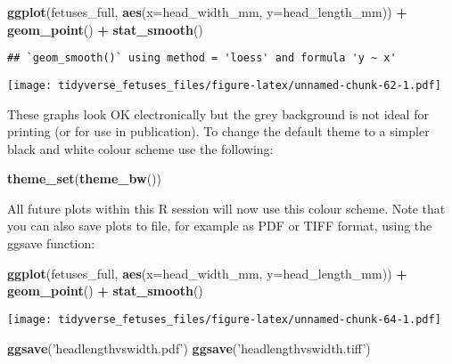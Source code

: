 \documentclass[
]{article}
\newenvironment{Shaded}{\begin{snugshade}}{\end{snugshade}}
\newcommand{\DataTypeTok}[1]{\textcolor[rgb]{0.13,0.29,0.53}{#1}}
\newcommand{\KeywordTok}[1]{\textcolor[rgb]{0.13,0.29,0.53}{\textbf{#1}}}
\newcommand{\NormalTok}[1]{#1}
\newcommand{\OperatorTok}[1]{\textcolor[rgb]{0.81,0.36,0.00}{\textbf{#1}}}
\newcommand{\StringTok}[1]{\textcolor[rgb]{0.31,0.60,0.02}{#1}}
\begin{document}
\begin{Shaded}
\begin{Highlighting}[]
\KeywordTok{ggplot}\NormalTok{(fetuses_full, }\KeywordTok{aes}\NormalTok{(}\DataTypeTok{x=}\NormalTok{head_width_mm, }\DataTypeTok{y=}\NormalTok{head_length_mm)) }\OperatorTok{+}
\StringTok{    }\KeywordTok{geom_point}\NormalTok{() }\OperatorTok{+}
\StringTok{    }\KeywordTok{stat_smooth}\NormalTok{()}
\end{Highlighting}
\end{Shaded}

\begin{verbatim}
## `geom_smooth()` using method = 'loess' and formula 'y ~ x'
\end{verbatim}

\texttt{[image: tidyverse\_fetuses\_files/figure-latex/unnamed-chunk-62-1.pdf]}

These graphs look OK electronically but the grey background is not ideal
for printing (or for use in publication). To change the default theme to
a simpler black and white colour scheme use the following:

\begin{Shaded}
\begin{Highlighting}[]
\KeywordTok{theme_set}\NormalTok{(}\KeywordTok{theme_bw}\NormalTok{())}
\end{Highlighting}
\end{Shaded}

All future plots within this R session will now use this colour scheme.
Note that you can also save plots to file, for example as PDF or TIFF
format, using the ggsave function:

\begin{Shaded}
\begin{Highlighting}[]
\KeywordTok{ggplot}\NormalTok{(fetuses_full, }\KeywordTok{aes}\NormalTok{(}\DataTypeTok{x=}\NormalTok{head_width_mm, }\DataTypeTok{y=}\NormalTok{head_length_mm)) }\OperatorTok{+}
\StringTok{    }\KeywordTok{geom_point}\NormalTok{() }\OperatorTok{+}
\StringTok{    }\KeywordTok{stat_smooth}\NormalTok{()}
\end{Highlighting}
\end{Shaded}

\texttt{[image: tidyverse\_fetuses\_files/figure-latex/unnamed-chunk-64-1.pdf]}

\begin{Shaded}
\begin{Highlighting}[]
\KeywordTok{ggsave}\NormalTok{(}\StringTok{'headlengthvswidth.pdf'}\NormalTok{)}
\KeywordTok{ggsave}\NormalTok{(}\StringTok{'headlengthvswidth.tiff'}\NormalTok{)}
\end{Highlighting}
\end{Shaded}
\end{document}
